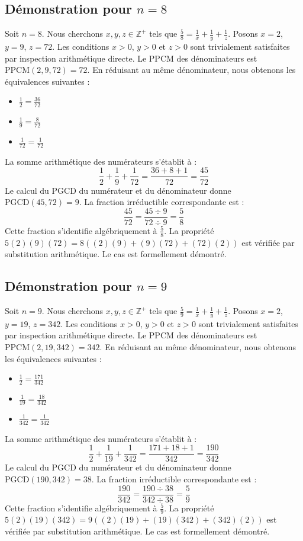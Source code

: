 \documentclass[12pt,a4paper]{article}
\begin{document}
\subsection{Démonstration pour $n = 8$}
Soit $n = 8$. Nous cherchons $x, y, z \in \mathbb{Z}^{+}$ tels que $\frac{5}{8} = \frac{1}{x} + \frac{1}{y} + \frac{1}{z}$.
Posons $x = 2$, $y = 9$, $z = 72$.
Les conditions $x > 0$, $y > 0$ et $z > 0$ sont trivialement satisfaites par inspection arithmétique directe.
Le PPCM des dénominateurs est $\text{PPCM}(2, 9, 72) = 72$.
En réduisant au même dénominateur, nous obtenons les équivalences suivantes :
\begin{itemize}
    \item $\frac{1}{2} = \frac{36}{72}$
    \item $\frac{1}{9} = \frac{8}{72}$
    \item $\frac{1}{72} = \frac{1}{72}$
\end{itemize}
La somme arithmétique des numérateurs s'établit à :
$$ \frac{1}{2} + \frac{1}{9} + \frac{1}{72} = \frac{36 + 8 + 1}{72} = \frac{45}{72} $$
Le calcul du PGCD du numérateur et du dénominateur donne $\text{PGCD}(45, 72) = 9$.
La fraction irréductible correspondante est :
$$ \frac{45}{72} = \frac{45 \div 9}{72 \div 9} = \frac{5}{8} $$
Cette fraction s'identifie algébriquement à $\frac{5}{8}$.
La propriété $5(2)(9)(72) = 8((2)(9) + (9)(72) + (72)(2))$ est vérifiée par substitution arithmétique.
Le cas est formellement démontré.

\subsection{Démonstration pour $n = 9$}
Soit $n = 9$. Nous cherchons $x, y, z \in \mathbb{Z}^{+}$ tels que $\frac{5}{9} = \frac{1}{x} + \frac{1}{y} + \frac{1}{z}$.
Posons $x = 2$, $y = 19$, $z = 342$.
Les conditions $x > 0$, $y > 0$ et $z > 0$ sont trivialement satisfaites par inspection arithmétique directe.
Le PPCM des dénominateurs est $\text{PPCM}(2, 19, 342) = 342$.
En réduisant au même dénominateur, nous obtenons les équivalences suivantes :
\begin{itemize}
    \item $\frac{1}{2} = \frac{171}{342}$
    \item $\frac{1}{19} = \frac{18}{342}$
    \item $\frac{1}{342} = \frac{1}{342}$
\end{itemize}
La somme arithmétique des numérateurs s'établit à :
$$ \frac{1}{2} + \frac{1}{19} + \frac{1}{342} = \frac{171 + 18 + 1}{342} = \frac{190}{342} $$
Le calcul du PGCD du numérateur et du dénominateur donne $\text{PGCD}(190, 342) = 38$.
La fraction irréductible correspondante est :
$$ \frac{190}{342} = \frac{190 \div 38}{342 \div 38} = \frac{5}{9} $$
Cette fraction s'identifie algébriquement à $\frac{5}{9}$.
La propriété $5(2)(19)(342) = 9((2)(19) + (19)(342) + (342)(2))$ est vérifiée par substitution arithmétique.
Le cas est formellement démontré.
\end{document}

